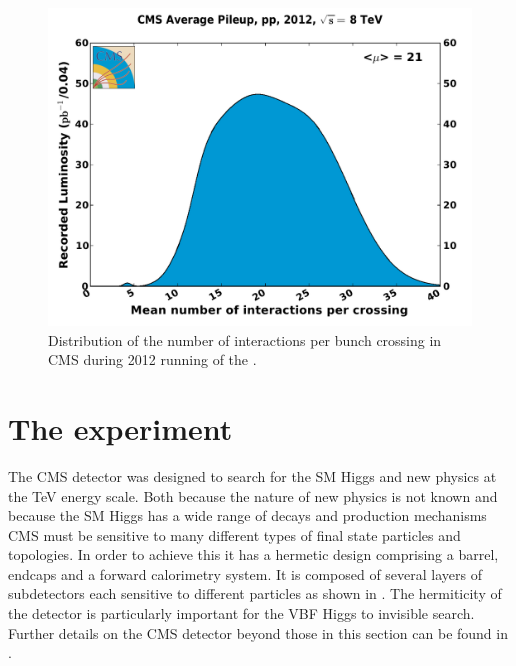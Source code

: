 \begin{figure}
  \includegraphics[width=1.2\largefigwidth]{plots/detector/pileup_pp_2012.pdf}
  \caption[Distribution of the number of interactions per bunch crossing in CMS during 2012 running of the \LHC.]{Distribution of the number of interactions per bunch crossing in CMS during 2012 running of the \LHC \cite{CMSLumiPublic}.}
  \label{fig:pusummary}
\end{figure}


\section{The \CMS experiment}
\label{sec:CMSInDetail}
The CMS detector was designed to search for the SM Higgs and new physics at the TeV energy scale. Both because the nature of new physics is not known and because the SM Higgs has a wide range of decays and production mechanisms CMS must be sensitive to many different types of final state particles and topologies. In order to achieve this it has a hermetic design comprising a barrel, endcaps and a forward calorimetry system. It is composed of several layers of subdetectors each sensitive to different particles as shown in . The hermiticity of the detector is particularly important for the VBF Higgs to invisible search. Further details on the CMS detector beyond those in this section can be found in . %

